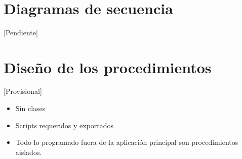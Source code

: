 \newpage
\
\newpage
\
\newpage
\section{Diagramas de secuencia}

[Pendiente]
 
\section{Diseño de los procedimientos}

[Provisional]

\begin{itemize}
    \item Sin clases
    \item Scripts requeridos y exportados
    \item Todo lo programado fuera de la aplicación principal son procedimientos aislados.
\end{itemize}